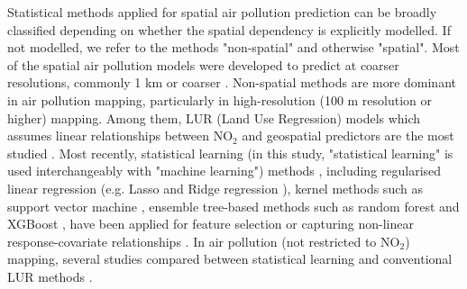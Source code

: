 \documentclass{article}
\begin{document}
Statistical methods applied for spatial air pollution prediction can be broadly classified depending on whether the spatial dependency is explicitly modelled. If not modelled, we refer to the methods "non-spatial" and otherwise "spatial". Most of the spatial air pollution models were developed to predict at coarser resolutions, commonly 1 km or coarser \citep{young2016satellite,shaddick2018data,BELOCONI2020105578}. Non-spatial methods are more dominant in air pollution mapping, particularly in high-resolution (100 m resolution or higher) mapping. Among them, LUR (Land Use Regression) models which assumes linear relationships between NO$_2$ and geospatial predictors are the most studied \citep{briggs2000regression,hoek2008review}. Most recently, statistical learning (in this study, "statistical learning" is used interchangeably with "machine learning") methods \citep{hastie2009elements}, including regularised linear regression (e.g. Lasso and Ridge regression \citep{James2013introduction}), kernel methods such as support vector machine \citep{svm1999least}, ensemble tree-based methods such as random forest \citep[RF,][]{breiman2001random} and XGBoost \citep[XGB,][]{chen2016xgboost}, have been applied for feature selection or capturing non-linear response-covariate relationships \citep{luglobal,chen2019comparison}. In air pollution (not restricted to NO$_2$) mapping, several studies compared between statistical learning and conventional LUR methods  \citep{chen2019comparison,kerckhoffs2019performance,luglobal,REN2020105827,machinereview}.
\end{document}
